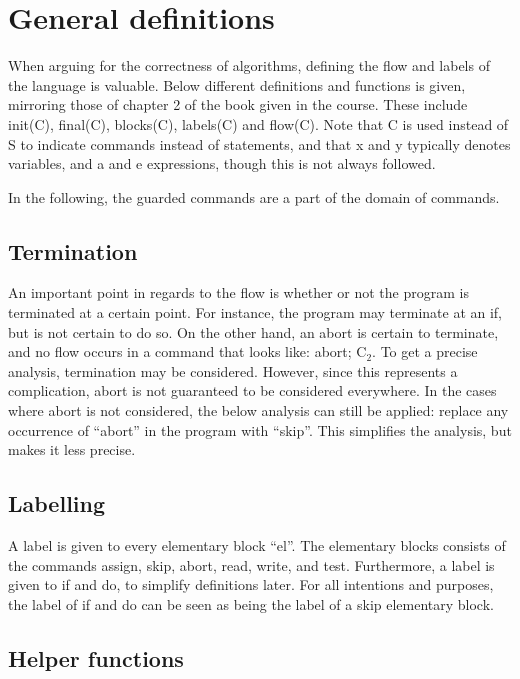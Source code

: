 \section{General definitions}

\docpar
When arguing for the correctness of algorithms, defining the flow and labels of the language is
valuable. Below different definitions and functions is given, mirroring those of chapter 2 of the
book given in the course. These include init(C), final(C), blocks(C), labels(C) and flow(C).
Note that C is used instead of S to indicate commands instead of statements, and that
x and y typically denotes variables, and a and e expressions, though this is not always followed.

In the following, the guarded commands are a part of the domain of commands.

\subsection{Termination}

An important point in regards to the flow is whether or not the program is terminated
at a certain point. For instance, the program may terminate at an if, but is not
certain to do so. On the other hand, an abort is certain to terminate, and no flow
occurs in a command that looks like: abort; C$_2$. To get a precise analysis, termination
may be considered. However, since this represents a complication, abort is not guaranteed
to be considered everywhere. In the cases where abort is not considered, the below analysis
can still be applied: replace any occurrence of ``abort'' in the program with ``skip''.
This simplifies the analysis, but makes it less precise.

\subsection{Labelling}

A label is given to every elementary block ``el''. The elementary blocks consists of
the commands assign, skip, abort, read, write, and test. Furthermore, a label is given
to if and do, to simplify definitions later. For all intentions and purposes, the
label of if and do can be seen as being the label of a skip elementary block.

\subsection{Helper functions}

